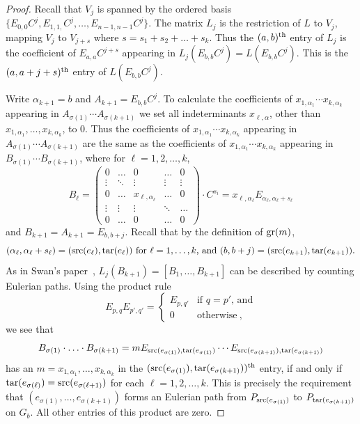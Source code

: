 \documentclass{amsproc}
\theoremstyle{definition}
\theoremstyle{remark}
\numberwithin{equation}{section}
\newcommand{\gr}{{\rm gr}}
\newcommand{\src}{{\rm src}}
\newcommand{\tar}{{\rm tar}}
\begin{document}
\begin{proof}
Recall that $V_j$ is spanned by the ordered basis $\{E_{0, 0} C^j,E_{1, 1,} C^j,\dots,E_{n-1, n-1} C^j\}$. The matrix $L_j$ is the restriction of $L$ to $V_j$, mapping $V_j$ to $V_{j+s}$ where $s=s_1+s_2+\dots+s_k$. Thus the $(a,b)^{\rm th}$ entry of $L_j$ is the coefficient of $E_{a, a}C^{j+s}$ appearing in 
$L_j(E_{b, b}C^j)=L(E_{b, b}C^j)$. This is the $(a,a+j+s)^{\rm th}$ entry of $L(E_{b, b}C^j)$.

Write $\alpha_{k+1}=b$ and $A_{k+1}=E_{b, b}C^j$. To calculate the coefficients of $x_{1,\alpha_1}\cdots x_{k,\alpha_k}$ appearing in $A_{\sigma(1)}\cdots A_{\sigma(k+1)}$ we set all indeterminants $x_{\ell, \alpha}$, other than $x_{1,\alpha_1},\dots,x_{k,\alpha_k}$, to $0$. Thus the coefficients of $x_{1,\alpha_1}\cdots x_{k,\alpha_k}$ appearing in $A_{\sigma(1)}\cdots A_{\sigma(k+1)}$ are the same as the coefficients of $x_{1,\alpha_1}\cdots x_{k,\alpha_k}$ appearing in $B_{\sigma(1)}\cdots B_{\sigma(k+1)}$, where for $\ell = 1, 2, \ldots, k$,
\[ B_\ell= \begin{pmatrix} 0 & \hdots & 0 & \hdots & 0 \\
\vdots & \ddots & \vdots & \vdots  & \vdots \\
0 & \hdots & x_{\ell, \alpha_\ell} & \hdots & 0 \\
\vdots & \vdots & \vdots & \ddots & \hdots  \\
0 & \hdots & 0 & \hdots & 0 
\end{pmatrix} \cdot C^{s_i} = x_{\ell, \alpha_\ell} E_{\alpha_\ell,\alpha_\ell + s_\ell} \]
and $B_{k+1} = A_{k+1} = E_{b, b + j}$. 
Recall that by the definition of $\gr(m)$, \[ \text{$(\alpha_\ell, \alpha_\ell + s_\ell) = (\src(e_\ell), \tar(e_\ell))$ for $\ell = 1, \ldots, k$, and
$(b, b+j) = (\src(e_{k+1}), \tar(e_{k+1}))$.} \]
As in Swan's paper~\cite{swan}, $L_j(B_{k+1}) = [B_1, \ldots, B_{k+1}]$
can be described by counting Eulerian paths. Using the product rule
\[ E_{p, q}E_{p', q'} =\begin{cases}
E_{p, q'} & \text{if $q = p'$, and}\\
0 & \text{otherwise}\ ,
\end{cases}\]
we see that 
\[ B_{\sigma(1)} \cdot \ldots \cdot B_{\sigma(k+1)} = m E_{\src(e_{\sigma(1)}),\tar(e_{\sigma(1)})}\cdots E_{\src(e_{\sigma(k+1)}),\tar(e_{\sigma(k+1)})} \]
has an $m = x_{1,\alpha_1},\dots,x_{k,\alpha_k}$ in the $(\src(e_{\sigma(1)}),\tar(e_{\sigma(k+1)}))^{\rm th}$ entry, if and only if $\tar(e_{\sigma(\ell)})=\src(e_{\sigma(\ell+1)})$ for each $\ell=1,2,\dots,k$. This is precisely the requirement that $(e_{\sigma(1)},\dots,e_{\sigma(k+1)})$ forms an Eulerian path from $P_{\src(e_{\sigma(1)})}$ to $P_{\tar(e_{\sigma(k+1)})}$ on $G_b$. All other entries of this product are zero.


\end{proof}
\end{document}
